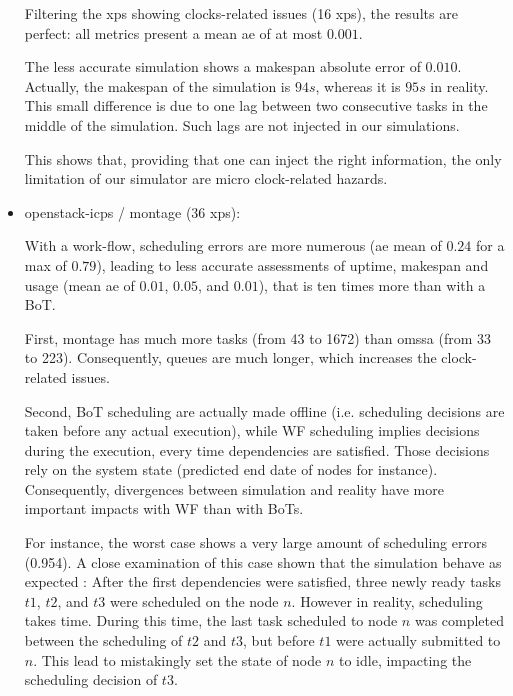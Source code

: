 \begin{itemize}
      Filtering the xps showing clocks-related issues (16 xps), the results are perfect:
      all metrics present a mean ae of at most $0.001$.
      
      The less accurate simulation shows a makespan absolute error of $0.010$. 
      Actually, the makespan of the simulation is $94s$, whereas it is $95s$ in reality.
      This small difference is due to one lag between two consecutive tasks 
      in the middle of the simulation. Such lags are not injected in our simulations.
      
      This shows that, providing that one can inject the right information, 
      the only limitation of our simulator are micro clock-related hazards.
      
      
 \item openstack-icps / montage (36 xps): 
 
      

      

      With a work-flow, scheduling errors are more numerous 
      (ae mean of $0.24$ for a max of $0.79$), leading to less accurate assessments
      of uptime, makespan and usage (mean ae of $0.01$, $0.05$, and $0.01$), that
      is ten times more than with a BoT.
      
      First, montage has much more tasks (from 43 to 1672) than omssa (from 33 to 223).
      Consequently, queues are much longer, which increases the clock-related issues.
      
      Second, BoT scheduling are actually made offline (i.e. scheduling decisions are taken
      before any actual execution), while WF scheduling implies decisions during 
      the execution, every time dependencies are satisfied. 
      Those decisions rely on the system state (predicted end date of nodes for 
      instance). Consequently, divergences between simulation and reality have
      more important impacts with WF than with BoTs.
      
      
      For instance, the worst case shows a very large amount of scheduling errors 
      (0.954). A close examination of this case shown that the simulation behave
      as expected : After the first dependencies were satisfied,
      three newly ready tasks $t1$, $t2$, and $t3$ were scheduled on the node $n$.
      However in reality, scheduling takes time. During this time, the last task
      scheduled to node $n$ was completed between the scheduling of $t2$ and $t3$, 
      but before $t1$ were actually submitted to $n$. This lead to mistakingly 
      set the state of node $n$ to idle, impacting the scheduling decision of $t3$.
      

\end{itemize}
